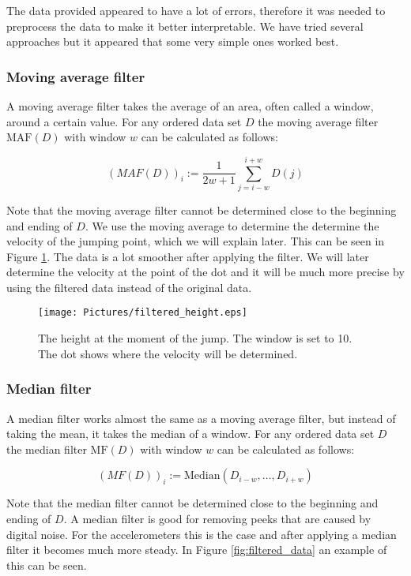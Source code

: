 The data provided appeared to have a lot of errors, therefore it was needed to preprocess the data to make it better interpretable. We have tried several approaches but it appeared that some very simple ones worked best.

\subsubsection{Moving average filter}
A moving average filter takes the average of an area, often called a window, around a certain value. For any ordered data set $D$ the moving average filter $\text{MAF}(D)$ with window $w$ can be calculated as follows:

\begin{equation}
  (MAF(D))_i := \frac1{2w+1}\sum_{j=i-w}^{i+w}D(j)
\end{equation}

Note that the moving average filter cannot be determined close to the beginning and ending of $D$. We use the moving average to determine the determine the velocity of the jumping point, which we will explain later. This can be seen in Figure \ref{fig:filtered_height}. The data is a lot smoother after applying the filter. We will later determine the velocity at the point of the dot and it will be much more precise by using the filtered data instead of the original data.

\begin{figure}
  \centering
  \texttt{[image: Pictures/filtered\_height.eps]}
  \caption{The height at the moment of the jump. The window is set to 10. The dot shows where the velocity will be determined.}
  \label{fig:filtered_height}
\end{figure}

\subsubsection{Median filter}
A median filter works almost the same as a moving average filter, but instead of taking the mean, it takes the median of a window. For any ordered data set $D$ the median filter $\text{MF}(D)$ with window $w$ can be calculated as follows:

\begin{equation}
  (MF(D))_i := \text{Median}(D_{i-w},\dots,D_{i+w})
\end{equation}

Note that the median filter cannot be determined close to the beginning and ending of $D$. A median filter is good for removing peeks that are caused by digital noise. For the accelerometers this is the case and after applying a median filter it becomes much more steady. In Figure \ref{fig:filtered_data} an example of this can be seen.

